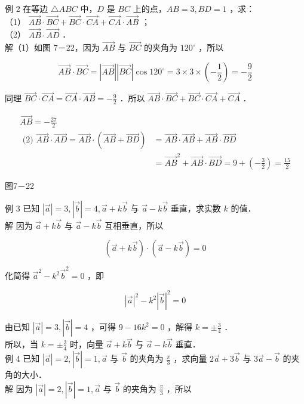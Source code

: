 \documentclass[10pt]{article}
\begin{document}
例 2 在等边 \(\triangle A B C\) 中，\(D\) 是 \(B C\) 上的点，\(A B=3, B D=1\) ，求：\\
（1） \(\overrightarrow{A B} \cdot \overrightarrow{B C}+\overrightarrow{B C} \cdot \overrightarrow{C A}+\overrightarrow{C A} \cdot \overrightarrow{A B}\) ；\\
（2） \(\overrightarrow{A B} \cdot \overrightarrow{A D}\) ．\\
解（1）如图 7－22，因为 \(\overrightarrow{A B}\) 与 \(\overrightarrow{B C}\) 的夹角为 \(120^{\circ}\) ，所以

\[
\overrightarrow{A B} \cdot \overrightarrow{B C}=|\overrightarrow{A B}||\overrightarrow{B C}| \cos 120^{\circ}=3 \times 3 \times\left(-\frac{1}{2}\right)=-\frac{9}{2}
\]

同理 \(\overrightarrow{B C} \cdot \overrightarrow{C A}=\overrightarrow{C A} \cdot \overrightarrow{A B}=-\frac{9}{2}\) ．所以 \(\overrightarrow{A B} \cdot \overrightarrow{B C}+\overrightarrow{B C} \cdot \overrightarrow{C A}+\overrightarrow{C A}\) ．

\[
\begin{aligned}
\overrightarrow{A B}=-\frac{27}{2} & \\
\text { (2) } \overrightarrow{A B} \cdot \overrightarrow{A D}=\overrightarrow{A B} \cdot(\overrightarrow{A B}+\overrightarrow{B D}) & =\overrightarrow{A B} \cdot \overrightarrow{A B}+\overrightarrow{A B} \cdot \overrightarrow{B D} \\
& =\overrightarrow{A B}^{2}+\overrightarrow{A B} \cdot \overrightarrow{B D}=9+\left(-\frac{3}{2}\right)=\frac{15}{2}
\end{aligned}
\]

图7－22

例 3 已知 \(|\vec{a}|=3,|\vec{b}|=4, \vec{a}+k \vec{b}\) 与 \(\vec{a}-k \vec{b}\) 垂直，求实数 \(k\) 的值．\\
解 因为 \(\vec{a}+k \vec{b}\) 与 \(\vec{a}-k \vec{b}\) 互相垂直，所以

\[
(\vec{a}+k \vec{b}) \cdot(\vec{a}-k \vec{b})=0
\]

化简得 \(\vec{a}^{2}-k^{2} \vec{b}^{2}=0\) ，即

\[
|\vec{a}|^{2}-k^{2}|\vec{b}|^{2}=0
\]

由已知 \(|\vec{a}|=3,|\vec{b}|=4\) ，可得 \(9-16 k^{2}=0\) ，解得 \(k= \pm \frac{3}{4}\) ．\\
所以，当 \(k= \pm \frac{3}{4}\) 时，向量 \(\vec{a}+k \vec{b}\) 与 \(\vec{a}-k \vec{b}\) 垂直．\\
例 4 已知 \(|\vec{a}|=2,|\vec{b}|=1, \vec{a}\) 与 \(\vec{b}\) 的夹角为 \(\frac{\pi}{3}\) ，求向量 \(2 \vec{a}+3 \vec{b}\) 与 \(3 \vec{a}-\vec{b}\) 的夹角的大小．\\
解 因为 \(|\vec{a}|=2,|\vec{b}|=1, \vec{a}\) 与 \(\vec{b}\) 的夹角为 \(\frac{\pi}{3}\) ，所以
\end{document}
